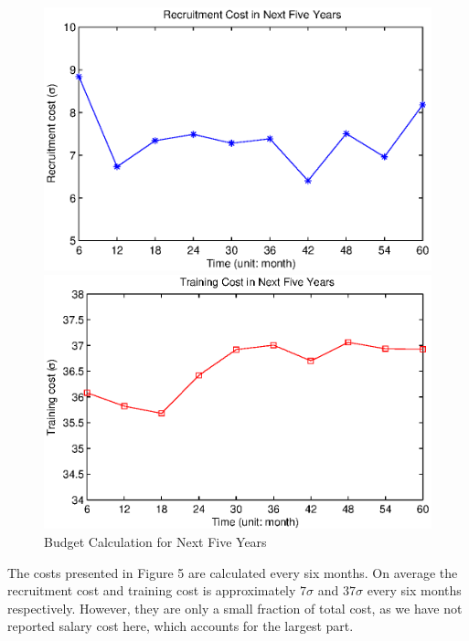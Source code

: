 \documentclass[tcn = 37075, sheet = false, abstract = false]{mcmthesis}
\begin{document}
	\begin{figure}[htbp]
		\begin{minipage}[t]{0.5\linewidth}
			\centering
			\includegraphics[width=1.0\textwidth]{figures/Recruitment_Cost.eps}
		\end{minipage}%
		\begin{minipage}[t]{0.5\linewidth}
			\centering
			\includegraphics[width=1.0\textwidth]{figures/Training_Cost.eps}
		\end{minipage}%
		\label{fig:bb5}
		\caption{Budget Calculation for Next Five Years}
	\end{figure}
	
	The costs presented in Figure 5 are calculated every six months. On average the recruitment cost and training cost is approximately $7\sigma$ and $37\sigma$ every six months respectively. However, they are only a small fraction of total cost, as we have not reported salary cost here, which accounts for the largest part.
	
\end{document}
